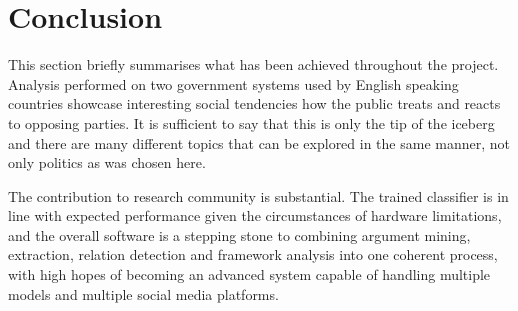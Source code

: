 \section{Conclusion} \label{conclusions}
    This section briefly summarises what has been achieved throughout the project. Analysis performed on two government systems used by English speaking countries showcase interesting social tendencies how the public treats and reacts to opposing parties. It is sufficient to say that this is only the tip of the iceberg and there are many different topics that can be explored in the same manner, not only politics as was chosen here.
    
    The contribution to research community is substantial. The trained classifier is in line with expected performance given the circumstances of hardware limitations, and the overall software is a stepping stone to combining argument mining, extraction, relation detection and framework analysis into one coherent process, with high hopes of becoming an advanced system capable of handling multiple models and multiple social media platforms.